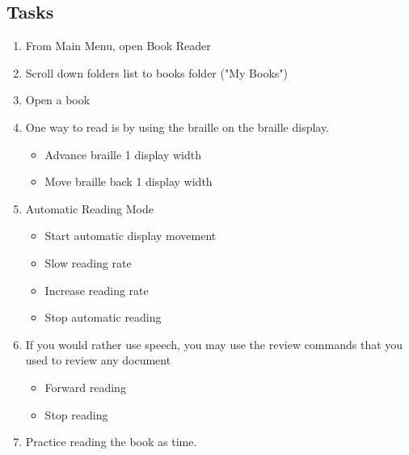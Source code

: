 \documentclass[10pt,letterpaper,twoside]{report}
\begin{document}
{\subsection{Tasks}
\begin{enumerate}
	\item From Main Menu, open Book Reader 
	\item Scroll down folders list to books folder ("My Books") 
	\item Open a book 
	\item One way to read is by using the braille on the braille display.
	      \begin{itemize}
		      \item Advance braille 1 display width 
		      \item Move braille back 1 display width 
	      \end{itemize}
	\item Automatic Reading Mode
	      \begin{itemize}
		      \item Start automatic display movement 
		      \item Slow reading rate 
		      \item Increase reading rate 
		      \item Stop automatic reading 
	      \end{itemize}
	\item If you would rather use speech, you may use the review commands that you used to review any document
	      \begin{itemize}
		      \item Forward reading 
		      \item Stop reading 
	      \end{itemize}
	\item Practice reading the book as time.
\end{enumerate}

}
\end{document}

